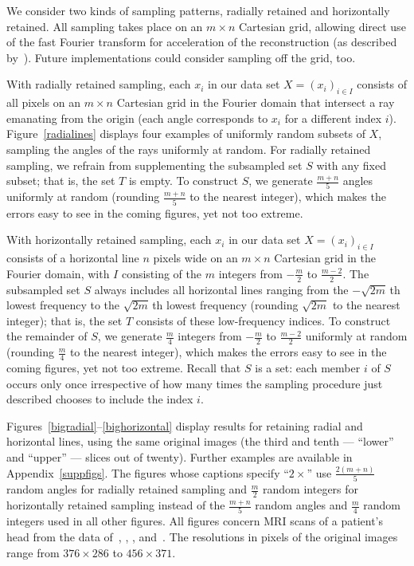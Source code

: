 \documentclass[article]{jdssv}
\begin{document}
We consider two kinds of sampling patterns,
radially retained and horizontally retained.
All sampling takes place on an $m \times n$ Cartesian grid,
allowing direct use of the fast Fourier transform
for acceleration of the reconstruction (as described by~\citet{tao-yang}).
Future implementations could consider sampling off the grid, too.

With radially retained sampling,
each $x_i$ in our data set $X = (x_i)_{i \in I}$
consists of all pixels on an $m \times n$ Cartesian grid in the Fourier domain
that intersect a ray emanating from the origin (each angle corresponds
to $x_i$ for a different index $i$). Figure~\ref{radialines} displays
four examples of uniformly random subsets of $X$, sampling the angles
of the rays uniformly at random.
For radially retained sampling, we refrain from supplementing
the subsampled set $S$ with any fixed subset; that is, the set $T$ is empty.
To construct $S$, we generate $\frac{m + n}{5}$ angles uniformly at random
(rounding $\frac{m + n}{5}$ to the nearest integer), which makes the errors
easy to see in the coming figures, yet not too extreme.

With horizontally retained sampling,
each $x_i$ in our data set $X = (x_i)_{i \in I}$
consists of a horizontal line $n$ pixels wide on an $m \times n$ Cartesian grid
in the Fourier domain, with $I$ consisting of the $m$ integers
from $-\frac{m}{2}$ to $\frac{m-2}{2}$.
The subsampled set $S$ always includes
all horizontal lines ranging from the $-\sqrt{2m}\,$th lowest frequency
to the $\sqrt{2m}\,$th lowest frequency
(rounding $\sqrt{2m}$ to the nearest integer);
that is, the set $T$ consists of these low-frequency indices.
To construct the remainder of $S$, we generate $\frac{m}{4}$ integers
from $-\frac{m}{2}$ to $\frac{m-2}{2}$ uniformly at random
(rounding $\frac{m}{4}$ to the nearest integer), which makes the errors
easy to see in the coming figures, yet not too extreme.
Recall that $S$ is a set: each member $i$ of $S$
occurs only once irrespective of how many times the sampling procedure
just described chooses to include the index $i$.

Figures~\ref{bigradial}--\ref{bighorizontal} display results for retaining
radial and horizontal lines, using the same original images
(the third and tenth --- ``lower'' and ``upper'' --- slices out of twenty).
Further examples are available in Appendix~\ref{suppfigs}.
The figures whose captions specify ``$2\times$'' use
$\frac{2(m + n)}{5}$ random angles for radially retained sampling
and $\frac{m}{2}$ random integers for horizontally retained sampling
instead of the $\frac{m + n}{5}$ random angles
and $\frac{m}{4}$ random integers used in all other figures.
All figures concern MRI scans of a patient's head from the data
of~\citet{mri2}, \citet{mri1}, \citet{mri3}, and~\citet{mri4}.
The resolutions in pixels of the original images range
from $376 \times 286$ to $456 \times 371$.
\end{document}
